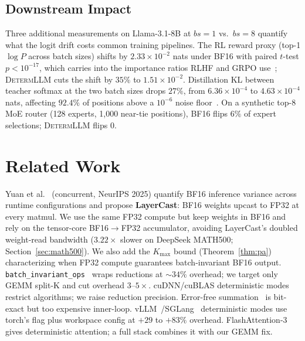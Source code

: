 \documentclass{article}
\newcommand{\dllm}{\textsc{DetermLLM}\xspace}
\begin{document}
\subsection{Downstream Impact}
\label{sec:downstream}

Three additional measurements on Llama-3.1-8B at $bs\!=\!1$ vs.\ $bs\!=\!8$
quantify what the logit drift costs common training pipelines. The RL reward
proxy (top-1 $\log P$ across batch sizes) shifts by $2.33\!\times\!10^{-2}$
nats under BF16 with paired $t$-test $p\!<\!10^{-17}$, which carries into the
importance ratios RLHF and GRPO use~\citep{ouyang2022instructgpt,schulman2017proximal,shao2024deepseekmath};
\dllm cuts the shift by $35\%$ to $1.51\!\times\!10^{-2}$. Distillation KL
between teacher softmax at the two batch sizes drops $27\%$, from
$6.36\!\times\!10^{-4}$ to $4.63\!\times\!10^{-4}$ nats, affecting $92.4\%$ of
positions above a $10^{-6}$ noise floor~\citep{hinton2015distilling,gu2024minillm}.
On a synthetic top-8 MoE router (128 experts, 1{,}000 near-tie positions),
BF16 flips $6\%$ of expert selections; \dllm flips $0$.

\section{Related Work}
\label{sec:related}

Yuan et al.~\citep{yuan2025numerical} (concurrent, NeurIPS 2025) quantify
BF16 inference variance across runtime configurations and propose
\textbf{LayerCast}: BF16 weights upcast to FP32 at every matmul. We use the
same FP32 compute but keep weights in BF16 and rely on the tensor-core
BF16$\to$FP32 accumulator, avoiding LayerCast's doubled weight-read
bandwidth ($3.22\times$ slower on DeepSeek MATH500; Section~\ref{sec:math500}).
We also add the $K_{\max}$ bound (Theorem~\ref{thm:pa}) characterizing when
FP32 compute guarantees batch-invariant BF16 output.
\texttt{batch\_invariant\_ops}~\citep{batchinvariantops2024} wraps reductions
at $\sim\!34\%$ overhead; we target only GEMM split-K and cut overhead
$3$--$5\times$. cuDNN/cuBLAS deterministic modes~\citep{cublas2024} restrict
algorithms; we raise reduction precision. Error-free
summation~\citep{demmel2013accurate,rump2010accurate} is bit-exact but too
expensive inner-loop. vLLM~\citep{kwon2023vllm}/SGLang~\citep{sglang2024}
deterministic modes use torch's flag plus workspace config at $+29$ to
$+83\%$ overhead. FlashAttention-3~\citep{shah2024flashattention3} gives
deterministic attention; a full stack combines it with our GEMM fix.
\end{document}
